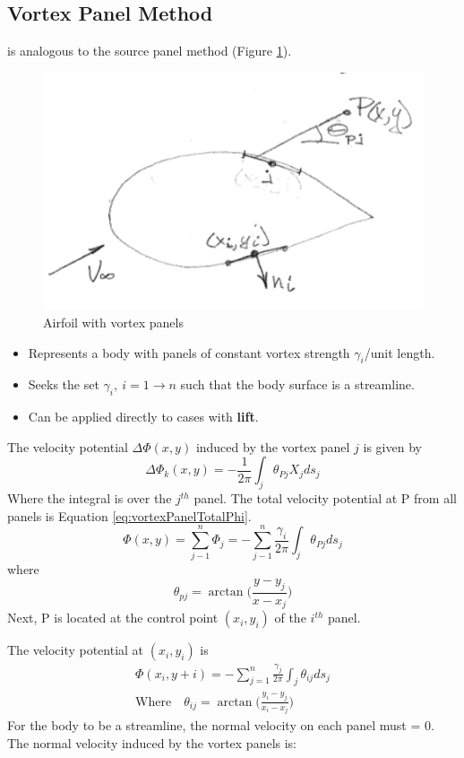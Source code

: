 \documentclass[draft=false, titlepage]{article}
\begin{document}
\subsection{Vortex Panel Method} is analogous to the source panel method (Figure \ref{fig:vortexPanelAirfoil}).
\begin{figure}[ht]
    \centering
    \includegraphics[width=0.4\linewidth]{Figures/vortexPanelAirfoil.PNG}
    \caption{Airfoil with vortex panels}
    \label{fig:vortexPanelAirfoil}
\end{figure}
\begin{itemize}
    \item Represents a body with panels of constant vortex strength $\gamma_i$/unit length.
    \item Seeks the set $\gamma_i,\ i=1\rightarrow n$ such that the body surface is a streamline.
    \item Can be applied directly to cases with \textbf{lift}.
\end{itemize}
The velocity potential $\Delta \Phi(x,y)$ induced by the vortex panel $j$ is given by
\begin{equation*}
    \Delta \Phi_k(x,y) = -\frac{1}{2\pi}\int_j \theta_{Pj} X_j ds_j
\end{equation*}
Where the integral is over the $j^{th}$ panel. The total velocity potential at P from all panels is Equation \ref{eq:vortexPanelTotalPhi}.
\begin{equation}
    \Phi(x,y) = \sum_{j-1}^n \Phi_j = -\sum_{j-1}^n \frac{\gamma_i}{2\pi} \int_j \theta_{Pj} ds_j
    \label{eq:vortexPanelTotalPhi}
\end{equation}
where \begin{equation*}
    \theta_{pj} = \arctan\big(\frac{y-y_j}{x-x_j}\big)
\end{equation*}
Next, P is located at the control point $(x_i, y_i)$ of the $i^{th}$ panel. 

The velocity potential at $(x_i, y_i)$ is
\begin{gather*}
    \Phi(x_i, y+i) = -\sum_{j=1}^n \frac{\gamma_j}{2\pi} \int_j \theta_{ij} ds_j\\
    \text{Where} \quad \theta_{ij} = \arctan\big( \frac{y_i-y_j}{x_i-x_j} \big)
\end{gather*}
For the body to be a streamline, the normal velocity on each panel must = 0. The normal velocity induced by the vortex panels is:
\end{document}
